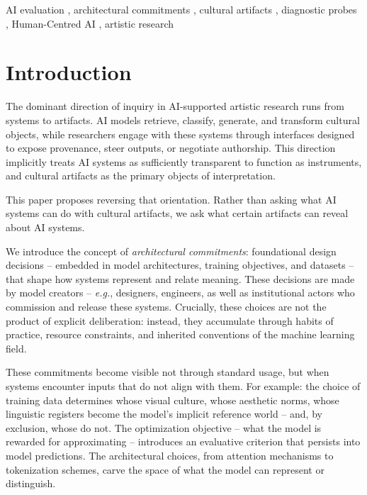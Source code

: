 \documentclass[
  twocolumn,
]{ceurart}
\begin{document}
\begin{keywords}
  AI evaluation \sep
  architectural commitments \sep
  cultural artifacts \sep
  diagnostic probes \sep
  Human-Centred AI \sep
  artistic research
\end{keywords}

\maketitle

\section{Introduction}

The dominant direction of inquiry in AI-supported artistic research runs from systems to artifacts. AI models retrieve, classify, generate, and transform cultural objects, while researchers engage with these systems through interfaces designed to expose provenance, steer outputs, or negotiate authorship. This direction implicitly treats AI systems as sufficiently transparent to function as instruments, and cultural artifacts as the primary objects of interpretation.

This paper proposes reversing that orientation. Rather than asking what AI systems can do with cultural artifacts, we ask what certain artifacts can reveal about AI systems.

We introduce the concept of \emph{architectural commitments}: foundational design decisions -- embedded in model architectures, training objectives, and datasets -- that shape how systems represent and relate meaning. These decisions are made by model creators -- \emph{e.g.}, designers, engineers, as well as institutional actors who commission and release these systems. Crucially, these choices are not the product of explicit deliberation: instead, they accumulate through habits of practice, resource constraints, and inherited conventions of the machine learning field.

These commitments become visible not through standard usage, but when systems encounter inputs that do not align with them. For example: the choice of training data determines whose visual culture, whose aesthetic norms, whose linguistic registers become the model's implicit reference world -- and, by exclusion, whose do not. The optimization objective -- what the model is rewarded for approximating -- introduces an evaluative criterion that persists into model predictions. The architectural choices, from attention mechanisms to tokenization schemes, carve the space of what the model can represent or distinguish.
\end{document}
